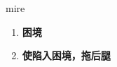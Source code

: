 
\begin{frame}
{\huge mire}
\begin{center}
\begin{enumerate}\Large
  \item \textbf{困境}
  \item \textbf{使陷入困境，拖后腿}
\end{enumerate}
\end{center}
\end{frame}

